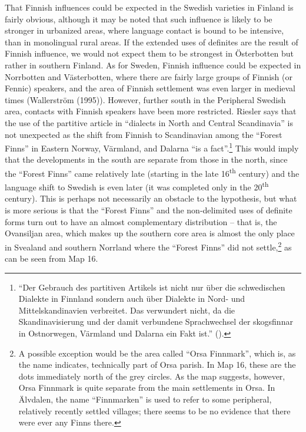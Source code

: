 
That Finnish influences could be expected in the Swedish varieties in Finland is fairly obvious, although it may be noted that such influence is likely to be stronger in urbanized areas, where language contact is bound to be intensive, than in monolingual rural areas. If the extended uses of definites are the result of Finnish influence, we would not expect them to be strongest in Österbotten but rather in southern Finland. As for Sweden, Finnish influence could be expected in Norrbotten and Västerbotten, where there are fairly large groups of Finnish (or Fennic) speakers, and the area of Finnish settlement was even larger in medieval times (Wallerström (1995)). However, further south in the Peripheral Swedish area, contacts with Finnish speakers have been more restricted. Riesler says that the use of the partitive article in “dialects in North and Central Scandinavia” is not unexpected as the shift from Finnish to Scandinavian among the “Forest Finns” in Eastern Norway, Värmland, and Dalarna “is a fact”.\footnote{ “Der Gebrauch des partitiven Artikels ist nicht nur über die schwedischen Dialekte in Finnland sondern auch über Dialekte in Nord- und Mittelskandinavien verbreitet. Das verwundert nicht, da die Skandinavisierung und der damit verbundene Sprachwechsel der skogsfinnar in Ostnorwegen, Värmland und Dalarna ein Fakt ist.” (\citet[57]{Riesler2002}). } This would imply that the developments in the south are separate from those in the north, since the “Forest Finns” came relatively late (starting in the late 16\textsuperscript{th }century) and the language shift to Swedish is even later (it was completed only in the 20\textsuperscript{th} century). This is perhaps not necessarily an obstacle to the hypothesis, but what is more serious is that the “Forest Finns” and the non-delimited uses of definite forms turn out to have an almost complementary distribution – that is, the Ovansiljan area, which makes up the southern core area is almost the only place in Svealand and southern Norrland where the “Forest Finns” did not settle,\footnote{ A possible exception would be the area called “Orsa Finnmark”, which is, as the name indicates, technically part of Orsa parish. In Map 16, these are the dots immediately north of the grey circles. As the map suggests, however, Orsa Finnmark is quite separate from the main settlements in Orsa. In Älvdalen, the name “Finnmarken” is used to refer to some peripheral, relatively recently settled villages; there seems to be no evidence that there were ever any Finns there. } as can be seen from Map 16.

